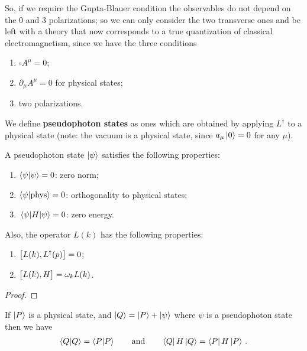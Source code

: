 \documentclass[main.tex]{subfiles}
\begin{document}
So, if we require the Gupta-Blauer condition the observables do not depend on the 0 and 3 polarizations; so we can only consider the two transverse ones and be left with a theory that now corresponds to a true quantization of classical electromagnetism, since we have the three conditions
\begin{enumerate}
    \item \(\square A^{\mu } = 0\);
    \item \(\partial_{\mu } A^{\mu } = 0\) for physical states;
    \item two polarizations.
\end{enumerate}

We define \textbf{pseudophoton states} as ones which are obtained by applying \(L ^\dag\) to a physical state (note: the vacuum is a physical state, since \(a_{\mu } \ket{0} = 0\) for any \(\mu \)). 

\begin{claim}
A pseudophoton state \(\ket{\psi }\) satisfies the following properties: 
\begin{enumerate}
    \item \(\braket{\psi }{\psi } = 0\): zero norm;
    \item \(\braket{\psi }{\text{phys}} = 0\): orthogonality to physical states;
    \item \(\ev{H}{\psi } = 0\): zero energy. 
\end{enumerate}

Also, the operator \(L(k)\) has the following properties: 
\begin{enumerate}
    \item \(\qty[L(k), L ^\dag(p)] = 0\);
    \item \(\qty[L(k), H] = \omega_{k} L(k)\). 
\end{enumerate}
\end{claim}

\begin{proof}
\end{proof}


\begin{claim}
If \(\ket{P}\) is a physical state, and \(\ket{Q} = \ket{P} + \ket{\psi }\) where \(\psi \) is a pseudophoton state then we have 
%
\begin{align}
\braket{Q}{Q} = \braket{P}{P} 
\qquad \text{and} \qquad
\bra{Q} H \ket{Q} = \bra{P} H \ket{P}
\,.
\end{align}
\end{claim}
\end{document}
